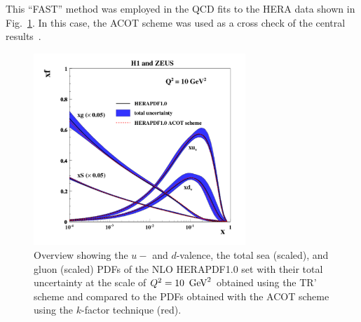 \begin{description}
\begin{itemize}
    This ``FAST'' method was employed in the QCD fits to the HERA data
    shown in Fig.~\ref{fig:acotrt}. In this case, the ACOT scheme was
    used as a cross check of the central results~\cite{h1zeus:2009wt}.

\begin{figure}[!ht]
\centering
\includegraphics[width=8cm]{heraacot}
  \caption{Overview showing the $u-$ and $d$-valence, the total sea
    (scaled), and gluon (scaled) PDFs of the NLO HERAPDF1.0 set with their 
    total uncertainty at the scale of $Q^2 = 10\ \,\text{Ge\hspace{-.08em}V}^2$ obtained 
    using the TR' scheme and compared to the PDFs obtained with 
    the ACOT scheme using the $k$-factor technique (red).}
 \label{fig:acotrt}
\end{figure}




\end{itemize}
\end{description}
